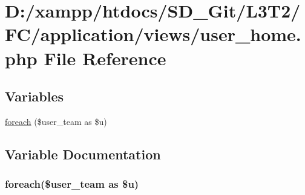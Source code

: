 \hypertarget{user__home_8php}{}\section{D\+:/xampp/htdocs/\+S\+D\+\_\+\+Git/\+L3\+T2/\+F\+C/application/views/user\+\_\+home.php File Reference}
\label{user__home_8php}
\subsection*{Variables}
\begin{DoxyCompactItemize}
\item 
\hyperlink{user__home_8php_a7ad0caecb10918b48851bd7908ec97c5}{foreach} (\$user\+\_\+team as \$u)
\end{DoxyCompactItemize}


\subsection{Variable Documentation}
\hypertarget{user__home_8php_a7ad0caecb10918b48851bd7908ec97c5}{}
\subsubsection[{foreach}]{\setlength{\rightskip}{0pt plus 5cm}foreach(\$user\+\_\+team as \$u)}\label{user__home_8php_a7ad0caecb10918b48851bd7908ec97c5}
